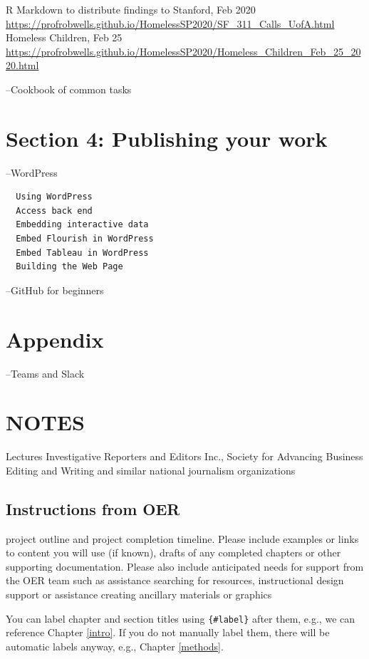 \documentclass[]{book}
\begin{document}
R Markdown to distribute findings to Stanford, Feb 2020
\url{https://profrobwells.github.io/HomelessSP2020/SF_311_Calls_UofA.html}
Homeless Children, Feb 25
\url{https://profrobwells.github.io/HomelessSP2020/Homeless_Children_Feb_25_2020.html}

--Cookbook of common tasks

\hypertarget{section-4-publishing-your-work}{%
\section{Section 4: Publishing your work}\label{section-4-publishing-your-work}}

--WordPress

\begin{verbatim}
  Using WordPress
  Access back end
  Embedding interactive data 
  Embed Flourish in WordPress
  Embed Tableau in WordPress
  Building the Web Page
\end{verbatim}

--GitHub for beginners

\hypertarget{appendix}{%
\section{Appendix}\label{appendix}}

--Teams and Slack

\hypertarget{notes}{%
\section{NOTES}\label{notes}}

Lectures
Investigative Reporters and Editors Inc., Society for Advancing Business Editing and Writing and similar national journalism organizations

\hypertarget{instructions-from-oer}{%
\subsection{Instructions from OER}\label{instructions-from-oer}}

project outline and project completion timeline. Please include examples or links to content you will use (if known), drafts of any completed chapters or other supporting documentation. Please also include anticipated needs for support from the OER team such as assistance searching for resources, instructional design support or assistance creating ancillary materials or graphics

You can label chapter and section titles using \texttt{\{\#label\}} after them, e.g., we can reference Chapter \ref{intro}. If you do not manually label them, there will be automatic labels anyway, e.g., Chapter \ref{methods}.
\end{document}
